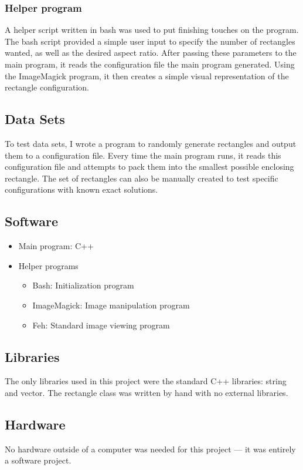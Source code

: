 \documentclass[10pt,titlepage,letterpaper]{article}
\begin{document}
	\subsubsection{Helper program}
	A helper script written in bash was used to put finishing touches on the program. The bash script provided a simple user input to specify the number of rectangles wanted, as well as the desired aspect ratio. After passing these parameters to the main program, it reads the configuration file the main program generated. Using the ImageMagick program, it then creates a simple visual representation of the rectangle configuration.
	\subsection{Data Sets}
	To test data sets, I wrote a program to randomly generate rectangles and output them to a configuration file. Every time the main program runs, it reads this configuration file and attempts to pack them into the smallest possible enclosing rectangle. The set of rectangles can also be manually created to test specific configurations with known exact solutions.
	\subsection{Software}
	\begin{itemize}
		\item Main program: C++
		\item Helper programs
		\begin{itemize}
			\item Bash: Initialization program
			\item ImageMagick: Image manipulation program
			\item Feh: Standard image viewing program
		\end{itemize}
	\end{itemize}
	\subsection{Libraries}
	The only libraries used in this project were the standard C++ libraries: string and vector. The rectangle class was written by hand with no external libraries.
	\subsection{Hardware}
	No hardware outside of a computer was needed for this project --- it was entirely a software project.
\end{document}
